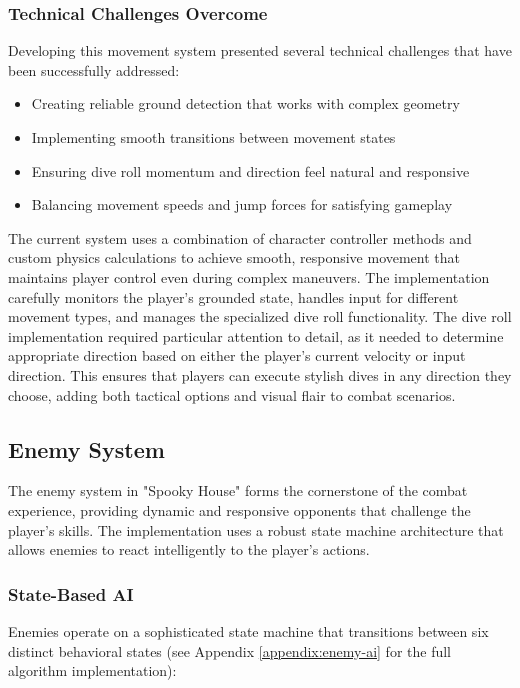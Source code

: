 \documentclass{article}
\begin{document}
    \subsubsection{Technical Challenges Overcome}
    Developing this movement system presented several technical challenges that have been successfully addressed:
    \begin{itemize}
        \item Creating reliable ground detection that works with complex geometry
        \item Implementing smooth transitions between movement states
        \item Ensuring dive roll momentum and direction feel natural and responsive
        \item Balancing movement speeds and jump forces for satisfying gameplay
    \end{itemize}

    The current system uses a combination of character controller methods and custom physics calculations to achieve smooth, responsive movement that maintains player control even during complex maneuvers.
    The implementation carefully monitors the player's grounded state, handles input for different movement types, and manages the specialized dive roll functionality.
    The dive roll implementation required particular attention to detail, as it needed to determine appropriate direction based on either the player's current velocity or input direction.
    This ensures that players can execute stylish dives in any direction they choose, adding both tactical options and visual flair to combat scenarios.

    \subsection{Enemy System}
    The enemy system in "Spooky House" forms the cornerstone of the combat experience, providing dynamic and responsive opponents that challenge the player's skills.
    The implementation uses a robust state machine architecture that allows enemies to react intelligently to the player's actions.

    \subsubsection{State-Based AI}
    Enemies operate on a sophisticated state machine that transitions between six distinct behavioral states (see Appendix \ref{appendix:enemy-ai} for the full algorithm implementation):
\end{document}
